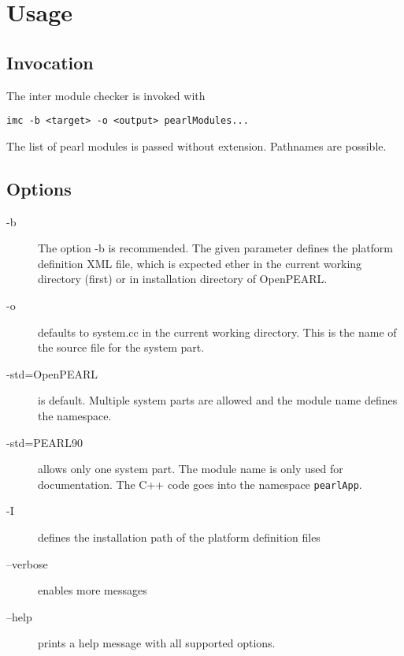 \chapter{Usage}

\section{Invocation}
The inter module checker is invoked with
\begin{verbatim}
imc -b <target> -o <output> pearlModules...
\end{verbatim}

The list of pearl modules is passed without extension. Pathnames are 
possible.

\section{Options}
\begin{description}
\item[-b] The option -b is  recommended. The given parameter defines the
platform definition XML file, which is expected ether in the current 
working directory (first)
or in installation directory of OpenPEARL.
\item [-o] defaults to system.cc in the current working directory. This is
  the name of the source file for the system part.
\item[-std=OpenPEARL] is default. Multiple system parts are allowed and the 
    module name defines the namespace.
\item[-std=PEARL90] allows only one system part. The module name is only used 
  for documentation. The C++ code goes into the namespace \texttt{pearlApp}.
\item[-I ] defines the installation path of the platform definition files
\item[--verbose] enables more messages 
\item[--help] prints a help message with all supported options.
\end{description}




